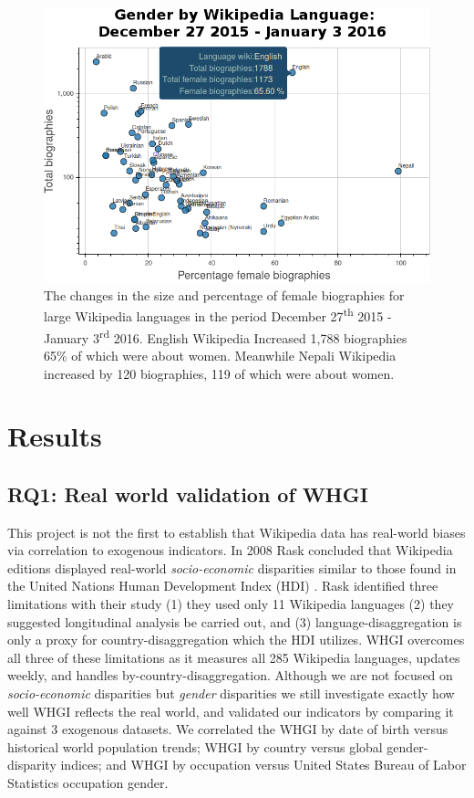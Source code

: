 \documentclass{sig-alternate-05-2015}
\begin{document}
\begin{figure}
\includegraphics[width=\columnwidth]{figures/genderbylang.png} 
\caption{The changes in the size and percentage of female biographies for large Wikipedia languages in the period December 27\textsuperscript{th} 2015 - January 3\textsuperscript{rd} 2016. English Wikipedia Increased 1,788 biographies 65\% of which were about women. Meanwhile Nepali Wikipedia increased by 120 biographies, 119 of which were about women.}
\label{fig:genderbylang}
\end{figure}


\section{Results}
\subsection{RQ1: Real world validation of WHGI}
This project is not the first to establish that Wikipedia data has real-world biases via correlation to exogenous indicators. In 2008 Rask concluded that Wikipedia editions displayed real-world \textit{socio-economic} disparities similar to those found in the United Nations Human Development Index (HDI) \cite{rask_reach_2008}. Rask identified three limitations with their study (1) they used only 11 Wikipedia languages (2) they suggested longitudinal analysis be carried out, and (3) language-disaggregation is only a proxy for country-disaggregation which the HDI utilizes. WHGI overcomes all three of these limitations as it measures all 285 Wikipedia languages, updates weekly, and handles by-country-disaggregation. Although we are not focused on \textit{socio-economic} disparities but \textit{gender} disparities we still investigate exactly how well WHGI reflects the real world, and validated our indicators by comparing it against 3 exogenous datasets. We correlated the WHGI by date of birth versus historical world population trends; WHGI by country versus global gender-disparity indices; and WHGI by occupation versus United States Bureau of Labor Statistics occupation gender.
\end{document}
